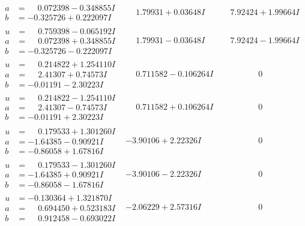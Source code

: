 \documentclass[1p]{elsarticle_modified}
\theoremstyle{definition}
\begin{document}
$$\begin{array}{c|c|c}
\begin{aligned}
a &= \phantom{-}0.072398 - 0.348855 I \\
b &= -0.325726 + 0.222097 I\end{aligned}
 & \phantom{-}1.79931 + 0.03648 I & \phantom{-}7.92424 + 1.99664 I \\ \hline\begin{aligned}
u &= \phantom{-}0.759398 - 0.065192 I \\
a &= \phantom{-}0.072398 + 0.348855 I \\
b &= -0.325726 - 0.222097 I\end{aligned}
 & \phantom{-}1.79931 - 0.03648 I & \phantom{-}7.92424 - 1.99664 I \\ \hline\begin{aligned}
u &= \phantom{-}0.214822 + 1.254110 I \\
a &= \phantom{-}2.41307 + 0.74573 I \\
b &= -0.01191 - 2.30223 I\end{aligned}
 & \phantom{-}0.711582 - 0.106264 I & \phantom{-0.000000 } 0 \\ \hline\begin{aligned}
u &= \phantom{-}0.214822 - 1.254110 I \\
a &= \phantom{-}2.41307 - 0.74573 I \\
b &= -0.01191 + 2.30223 I\end{aligned}
 & \phantom{-}0.711582 + 0.106264 I & \phantom{-0.000000 } 0 \\ \hline\begin{aligned}
u &= \phantom{-}0.179533 + 1.301260 I \\
a &= -1.64385 - 0.90921 I \\
b &= -0.86058 + 1.67816 I\end{aligned}
 & -3.90106 + 2.22326 I & \phantom{-0.000000 } 0 \\ \hline\begin{aligned}
u &= \phantom{-}0.179533 - 1.301260 I \\
a &= -1.64385 + 0.90921 I \\
b &= -0.86058 - 1.67816 I\end{aligned}
 & -3.90106 - 2.22326 I & \phantom{-0.000000 } 0 \\ \hline\begin{aligned}
u &= -0.130364 + 1.321870 I \\
a &= \phantom{-}0.694450 + 0.523183 I \\
b &= \phantom{-}0.912458 - 0.693022 I\end{aligned}
 & -2.06229 + 2.57316 I & \phantom{-0.000000 } 0 \\ \hline\begin{aligned}

\end{aligned}
\end{array}$$
\end{document}
